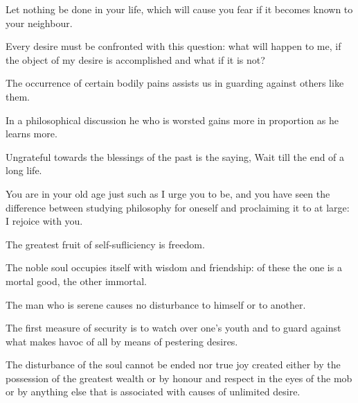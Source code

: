 \documentclass{stex}
\begin{document}
\vspace{0.5em}
\begin{sparagraph}[title=70]
  Let nothing be done in your life, which will cause you fear if it becomes known to your neighbour.
\end{sparagraph}
\vspace{0.5em}
\begin{sparagraph}[title=71]
  Every desire must be confronted with this question: what will happen to me, if the object of my desire is accomplished and what if it is not?
\end{sparagraph}
\vspace{0.5em}
\begin{sparagraph}[title=73]
  The occurrence of certain bodily pains assists us in guarding against others like them.
\end{sparagraph}
\vspace{0.5em}
\begin{sparagraph}[title=74]
  In a philosophical discussion he who is worsted gains more in proportion as he learns more.
\end{sparagraph}
\vspace{0.5em}
\begin{sparagraph}[title=75]
  Ungrateful towards the blessings of the past is the saying, Wait till the end of a long life.
\end{sparagraph}
\vspace{0.5em}
\begin{sparagraph}[title=76]
  You are in your old age just such as I urge you to be, and you have seen the difference between studying philosophy for oneself and proclaiming it to  at large: I rejoice with you.
\end{sparagraph}
\vspace{0.5em}
\begin{sparagraph}[title=77]
  The greatest fruit of self-sufliciency is freedom.
\end{sparagraph}
\vspace{0.5em}
\begin{sparagraph}[title=78]
  The noble soul occupies itself with wisdom and friendship: of these the one is a mortal good, the other immortal.
\end{sparagraph}
\vspace{0.5em}
\begin{sparagraph}[title=79]
  The man who is serene causes no disturbance to himself or to another.
\end{sparagraph}
\vspace{0.5em}
\begin{sparagraph}[title=80]
  The first measure of security is to watch over one’s youth and to guard against what makes havoc of all by means of pestering desires.
\end{sparagraph}
\vspace{0.5em}
\begin{sparagraph}[title=81]
  The disturbance of the soul cannot be ended nor true joy created either by the possession of the greatest wealth or by honour and respect in the eyes of the mob or by anything else that is associated with causes of unlimited desire.
\end{sparagraph}
\end{document}
